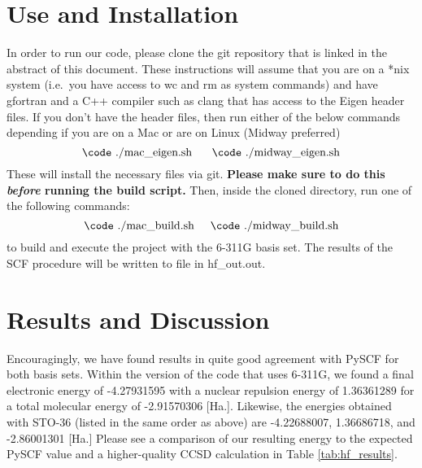\documentclass[%
 aip,
 amsmath,amssymb,
 reprint,%
]{revtex4-1}
\begin{document}
\section{Use and Installation}
In order to run our code, please clone the git repository that is linked in
the abstract of this document. These instructions will assume that you are
 on a *nix system (i.e.\ you have access to {\code wc} and {\code rm} as
 system commands) and have {\code gfortran} and a C++ compiler such as 
 {\code clang} that has access to the Eigen header files. If you don't
have the header files,  then run either of the below commands depending if you
are on a Mac or are on Linux (Midway preferred)
$$ \text{{\code ./mac\_eigen.sh} \hspace{0.5cm}{\code ./midway\_eigen.sh}}$$
These will install the necessary files via git.  \textbf{Please make sure to
do this \emph{before} running the build script.} Then, inside the cloned
directory, run one of the following commands: 
%
$$ \text{{\code ./mac\_build.sh}} \hspace{0.5cm}
 \text{{\code ./midway\_build.sh}} $$
to build and execute the project with the 6-311G basis set. The results of
the SCF procedure will be written to file in {\code hf\_out.out}.

\section{Results and Discussion}
Encouragingly, we have found results in quite good agreement with PySCF for
both basis sets.  Within the version of the code that uses 6-311G,
we found a final electronic energy of -4.27931595  with a nuclear repulsion energy
of 1.36361289   
for a total molecular energy of  -2.91570306 [Ha.]. Likewise, the energies
obtained with STO-36 (listed in the same order as above) are   -4.22688007, 
1.36686718, and -2.86001301 [Ha.]
Please see a comparison of our
resulting energy to the expected PySCF value and a higher-quality CCSD
calculation  in Table \ref{tab:hf_results}. 
\end{document}
